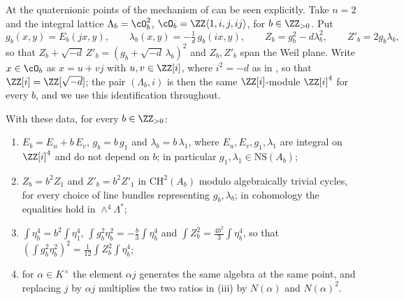 At the quaternionic points of  the mechanism of
 can be seen explicitly. Take $n=2$ and the integral
lattice
$\Lambda_{b}=\cO_{b}^{2}$, $\cO_{b}=\ZZ\langle 1,i,j,ij\rangle$, for
$b\in\ZZ_{>0}$. Put
\[
  g_{b}(x,y)=E_{b}(jx,y),\qquad
  \lambda_{b}(x,y)=-\tfrac{1}{d}\,g_{b}(ix,y),\qquad
  Z_{b}=g_{b}^{2}-d\lambda_{b}^{2},\qquad Z'_{b}=2g_{b}\lambda_{b},
\]
so that $Z_{b}+\sqrt{-d}\,Z'_{b}=(g_{b}+\sqrt{-d}\,\lambda_{b})^{2}$ and
$Z_{b},Z'_{b}$ span the Weil plane. Write $x\in\cO_{b}$ as $x=u+vj$ with
$u,v\in\ZZ[i]$, where $i^{2}=-d$ as in , so that
$\ZZ[i]=\ZZ[\sqrt{-d}]$; the pair $(\Lambda_{b},i)$ is then the same $\ZZ[i]$-module
$\ZZ[i]^{4}$ for every $b$, and we use this identification throughout.

\begin{proposition}
\label{prop:quatdivisible}
With these data, for every $b\in\ZZ_{>0}$:
\begin{enumerate}[label=\textup{(\roman*)},nosep]
\item $E_{b}=E_{u}+b\,E_{v}$, $g_{b}=b\,g_{1}$ and $\lambda_{b}=b\,\lambda_{1}$,
  where $E_{u},E_{v},g_{1},\lambda_{1}$ are integral on $\ZZ[i]^{4}$ and do not
  depend on $b$; in particular $g_{1},\lambda_{1}\in\mathrm{NS}(A_{b})$;
\item $Z_{b}=b^{2}Z_{1}$ and $Z'_{b}=b^{2}Z'_{1}$ in $\mathrm{CH}^{2}(A_{b})$
  modulo algebraically trivial cycles, for every choice of line bundles
  representing $g_{b},\lambda_{b}$; in cohomology the equalities hold in
  $\wedge^{4}\Lambda^{*}$;
\item $\int\eta_{b}^{4}=b^{2}\int\eta_{1}^{4}$,
  $\int g_{b}^{2}\eta_{b}^{2}=-\tfrac{b}{3}\int\eta_{b}^{4}$ and
  $\int Z_{b}^{2}=\tfrac{4b^{2}}{3}\int\eta_{b}^{4}$, so that
  $(\int g_{b}^{2}\eta_{b}^{2})^{2}=\tfrac{1}{12}\int Z_{b}^{2}\int\eta_{b}^{4}$;
\item for $\alpha\in K^{\times}$ the element $\alpha j$ generates the same
  algebra at the same point, and replacing $j$ by $\alpha j$ multiplies the
  two ratios in \textup{(iii)} by $N(\alpha)$ and $N(\alpha)^{2}$.
\end{enumerate}
\end{proposition}

